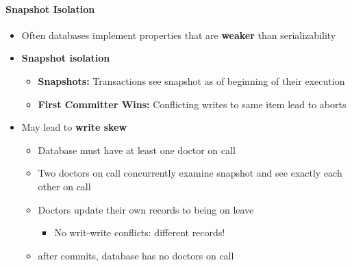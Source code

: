 \paragraph{Snapshot Isolation}
\begin{itemize}
\item Often databases implement properties that are \textbf{weaker}
  than serializability
\item \textbf{Snapshot isolation}
  \begin{itemize}
  \item \textbf{Snapshots:} Transactions see snapshot as of beginning
    of their execution
  \item \textbf{First Committer Wins:} Conflicting writes to same
    item lead to aborts
  \end{itemize}
\item May lead to \textbf{write skew}
  \begin{itemize}
  \item Database must have at least one doctor on call
  \item Two doctors on call concurrently examine snapshot and see
    exactly each other on call
  \item Doctors update their own records to being on leave
    \begin{itemize}
    \item No writ-write conflicts: different records!
    \end{itemize}
  \item after commits, database has no doctors on call
  \end{itemize}
\end{itemize}
